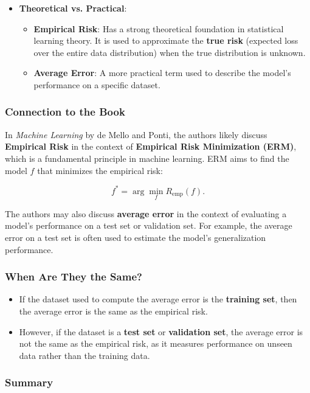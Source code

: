 \begin{notechapter}
\begin{itemize}
    \item \textbf{Theoretical vs. Practical}:
        \begin{itemize}
            \item \textbf{Empirical Risk}: Has a strong theoretical foundation in statistical learning theory. It is used to approximate the \textbf{true risk} (expected loss over the entire data distribution) when the true distribution is unknown.
            \item \textbf{Average Error}: A more practical term used to describe the model's performance on a specific dataset.
        \end{itemize}
\end{itemize}

\subsubsection{Connection to the Book}

In \textit{Machine Learning} by de Mello and Ponti, the authors likely discuss \textbf{Empirical Risk} in the context of \textbf{Empirical Risk Minimization (ERM)}, which is a fundamental principle in machine learning. ERM aims to find the model \( f \) that minimizes the empirical risk:

\[
f^* = \arg\min_f R_{\text{emp}}(f).
\]

The authors may also discuss \textbf{average error} in the context of evaluating a model's performance on a test set or validation set. For example, the average error on a test set is often used to estimate the model's generalization performance.

\subsubsection{When Are They the Same?}

\begin{itemize}
    \item If the dataset used to compute the average error is the \textbf{training set}, then the average error is the same as the empirical risk.
    \item However, if the dataset is a \textbf{test set} or \textbf{validation set}, the average error is not the same as the empirical risk, as it measures performance on unseen data rather than the training data.
\end{itemize}

\subsubsection{Summary}


\end{notechapter}
